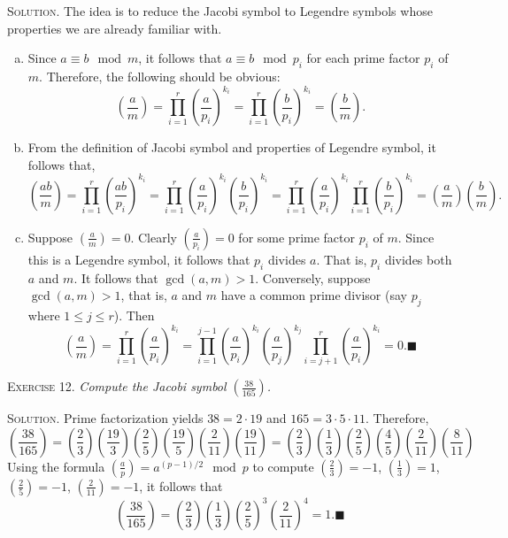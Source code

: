 \documentclass[11pt, leqno]{article}
\newcommand{\done}{\ensuremath{\blacksquare}}
\begin{document}
\textsc{Solution}. The idea is to reduce the Jacobi symbol to Legendre symbols whose properties we are already familiar with.
\begin{enumerate}[(a)]
\item Since $a\equiv b \mod m$, it follows that $a \equiv b \mod p_i$ for each prime factor $p_i$ of $m$. Therefore, the following should be obvious: 
\begin{displaymath}
\left( \frac{a}{m} \right) = \prod_{i=1}^r \left( \frac{a}{p_i} \right)^{k_i} = \prod_{i=1}^r \left( \frac{b}{p_i} \right)^{k_i} = \left( \frac{b}{m} \right).
\end{displaymath} 
\item From the definition of Jacobi symbol and properties of Legendre symbol, it follows that, 
\begin{displaymath}
\left( \frac{ab}{m} \right) = \prod_{i=1}^r \left( \frac{ab}{p_i} \right)^{k_i} = \prod_{i=1}^r \left( \frac{a}{p_i} \right)^{k_i} \left( \frac{b}{p_i} \right)^{k_i} = \prod_{i=1}^r \left( \frac{a}{p_i} \right)^{k_i} \prod_{i=1}^r \left( \frac{b}{p_i} \right)^{k_i} = \left( \frac{a}{m} \right) \left( \frac{b}{m} \right).
\end{displaymath} 
\item Suppose $\left( \frac{a}{m} \right) = 0$. Clearly $\left( \frac{a}{p_i} \right) = 0$ for some prime factor $p_i$ of $m$. Since this is a Legendre symbol, it follows that $p_i$ divides $a$. That is, $p_i$ divides both $a$ and $m$. It follows that $\gcd(a,m)>1$. Conversely, suppose $\gcd(a,m)>1$, that is, $a$ and $m$ have a common prime divisor (say $p_j$ where $1\leq j \leq r$). Then 
\begin{displaymath}
\left( \frac{a}{m} \right) = \prod_{i=1}^r \left( \frac{a}{p_i} \right)^{k_i} = \prod_{i=1}^{j-1} \left( \frac{a}{p_i} \right)^{k_i} \left( \frac{a}{p_j} \right)^{k_j} \prod_{i=j+1}^r \left( \frac{a}{p_i} \right)^{k_i} = 0. \done
\end{displaymath}
\end{enumerate}

\textsc{Exercise 12}. \emph{Compute the Jacobi symbol $\left( \frac{38}{165} \right)$.}

\textsc{Solution}. Prime factorization yields $38 = 2 \cdot 19$ and $165 = 3 \cdot 5 \cdot 11$. Therefore, 
\begin{displaymath}
\left( \frac{38}{165} \right) = \left( \frac{2}{3} \right) \left( \frac{19}{3} \right) \left( \frac{2}{5} \right) \left( \frac{19}{5} \right) \left( \frac{2}{11} \right) \left( \frac{19}{11} \right) = \left( \frac{2}{3} \right) \left( \frac{1}{3} \right) \left( \frac{2}{5} \right) \left( \frac{4}{5} \right) \left( \frac{2}{11} \right) \left( \frac{8}{11} \right)
\end{displaymath}
Using the formula $\left( \frac{a}{p} \right) = a^{(p-1)/2} \mod p$ to compute $\left( \frac{2}{3} \right) = -1$, $\left( \frac{1}{3} \right) = 1$, $\left( \frac{2}{5} \right) = -1$, $\left( \frac{2}{11} \right) = -1$, it follows that 
\begin{displaymath}
\left( \frac{38}{165} \right) = \left( \frac{2}{3} \right) \left( \frac{1}{3} \right) \left( \frac{2}{5} \right)^3 \left( \frac{2}{11} \right)^4 = 1. \done
\end{displaymath}
\end{document}
